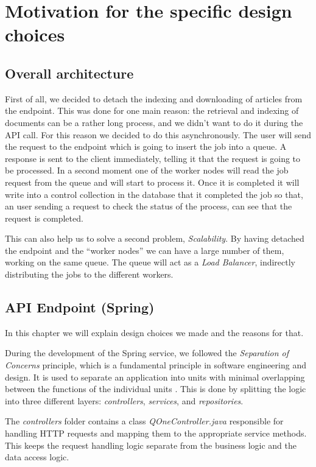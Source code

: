\section{Motivation for the specific design choices}
\label{ch:motivation}

\subsection{Overall architecture}
First of all, we decided to detach the indexing and downloading of articles
from the endpoint. This was done for one main reason: the retrieval and indexing
of documents can be a rather long process, and we didn't want to do it during
the API call. For this reason we decided to do this asynchronously. The user
will send the request to the endpoint which is going to insert the job into a
queue. A response is sent to the client immediately, telling it that the request
is going to be processed. In a second moment one of the worker nodes will read
the job request from the queue and will start to process it. Once it is completed
it will write into a control collection in the database that it completed the job
so that, an user sending a request to check the status of the process, can
see that the request is completed.

This can also help us to solve a second problem, \textit{Scalability}.
By having detached the endpoint and the ``worker nodes'' we can have a large number
of them, working on the same queue. The queue will act as a \textit{Load Balancer},
indirectly distributing the jobs to the different workers.

\subsection{API Endpoint (Spring)}
In this chapter we will explain design choices we made and the reasons for that.

During the development of the Spring service, we followed the \textit{Separation of Concerns} principle, which is a
fundamental principle in software engineering and design. It is used to separate an application into units with
minimal overlapping between the functions of the individual units \cite{geeksforgeeks:soc}. This is done by splitting
the logic into three different layers: \textit{controllers}, \textit{services}, and \textit{repositories}.

The \textit{controllers} folder contains a class \textit{QOneController.java} responsible for handling HTTP requests
and mapping them to the appropriate service methods. This keeps the request handling logic separate from the business
logic and the data access logic.

